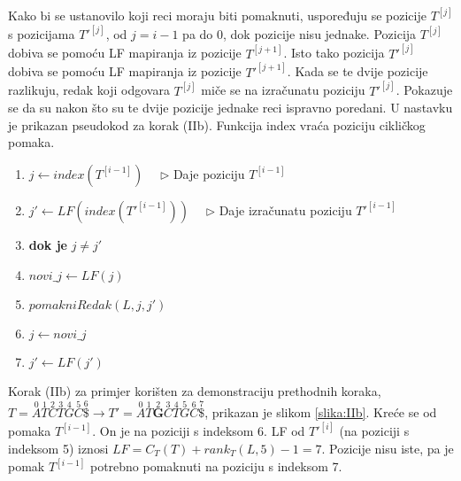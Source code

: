 \documentclass{ferseminar}
\begin{document}
Kako bi se ustanovilo koji reci moraju biti pomaknuti, uspoređuju se pozicije $T^{[j]}$ s pozicijama $T'^{[j]}$, od $j=i-1$ pa do $0$, dok pozicije nisu jednake. Pozicija $T^{[j]}$ dobiva se pomoću LF mapiranja iz pozicije $T^{[j+1]}$. Isto tako pozicija $T'^{[j]}$ dobiva se pomoću LF mapiranja iz pozicije $T'^{[j+1]}$. Kada se te dvije pozicije razlikuju, redak koji odgovara $T^{[j]}$ miče se na izračunatu poziciju $T'^{[j]}$. Pokazuje se da su nakon što su te dvije pozicije jednake reci ispravno poredani.
U nastavku je prikazan pseudokod za korak (IIb). Funkcija index vraća poziciju cikličkog pomaka.
\footnotesize
\begin{enumerate}
	\item $j\longleftarrow index(T^{[i-1]}) \quad$ $\triangleright$ Daje poziciju $T^{[i-1]}$
	\item $j'\longleftarrow LF(index(T'^{[i-1]})) \quad$ $\triangleright$ Daje izračunatu poziciju $T'^{[i-1]}$
	\item \textbf{dok je} $j\neq j'$
	\item \hspace{.1\textwidth} $novi\_j \longleftarrow LF(j) $
	\item \hspace{.1\textwidth} $pomakniRedak(L,j,j')$
	\item \hspace{.1\textwidth} $j \longleftarrow novi\_j $
	\item \hspace{.1\textwidth} $j' \longleftarrow LF(j') $
\end{enumerate}
\normalsize
Korak (IIb) za primjer korišten za demonstraciju prethodnih koraka, $
	T=\overset{0}{A}	\overset{1}{T} \overset{2}{C} \overset{3}{T}	\overset{4}{G}
	\overset{5}{C}	\overset{6}{\$} \rightarrow		
	T'=\overset{0}{A}	\overset{1}{T}	\overset{2}{\boldsymbol{G}}  \overset{3}{C} \overset{4}{T}	\overset{5}{G}
	\overset{6}{C}	\overset{7}{\$} 	
$,  prikazan je slikom \ref{slika:IIb}. Kreće se od pomaka $T^{[i-1]}$. On je na poziciji s indeksom 6. LF od $T'^{[i]}$ (na poziciji s indeksom 5) iznosi $LF=C_T(T)+rank_T(L,5)-1=7$. Pozicije nisu iste, pa je pomak $T^{[i-1]}$ potrebno pomaknuti na poziciju s indeksom 7.
\end{document}
